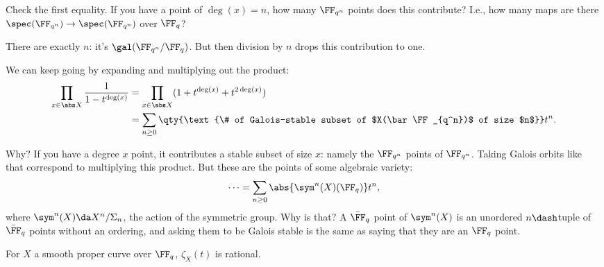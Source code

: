 \begin{exercise}

Check the first equality. If you have a point of \(\deg(x) = n\), how
many \(\FF_{q^n}\) points does this contribute? I.e., how many maps are
there \(\spec(\FF_{q^n}) \to \spec(\FF_{q^n})\) over \(\FF_q\)?

There are exactly \(n\): it's \(\gal(\FF_{q^n} / \FF_q)\). But then
division by \(n\) drops this contribution to one.

\end{exercise}

We can keep going by expanding and multiplying out the product:
\begin{align*}  
\prod_{x\in \abs X} {1 \over 1 - t^{\deg(x)}}
&= \prod_{x\in \abs X} (1 + t^{\deg(x)} + t^{2 \deg(x)}) \\
&= \sum_{n\geq 0} \qty{\text{\# of Galois-stable subset of $X(\bar \FF_{q^n})$ of size $n$}}t^n
.\end{align*}

Why? If you have a degree \(x\) point, it contributes a stable subset of
size \(x\): namely the \(\FF_{q^n}\) points of \(\FF_{q^n}\). Taking
Galois orbits like that correspond to multiplying this product. But
these are the points of some algebraic variety:
\begin{align*}  
\cdots 
= \sum_{n\geq 0} \abs{\sym^n(X)(\FF_q)} t^n
,\end{align*} where \(\sym^n(X) \da X^n/\Sigma_n\), the action of the
symmetric group. Why is that? A \(\bar \FF_q\) point of \(\sym^n(X)\) is
an unordered \(n\dash\)tuple of \(\bar \FF_q\) points without an
ordering, and asking them to be Galois stable is the same as saying that
they are an \(\FF_q\) point.

\begin{theorem}

For \(X\) a smooth proper curve over \(\FF_q\), \(\zeta_X(t)\) is
rational.

\end{theorem}


